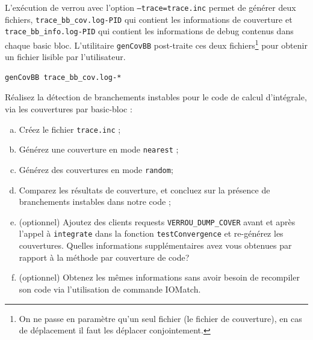 \documentclass[a4paper]{article}
\newcounter{Question}
\newenvironment{question}[1][\unskip]{
  \bigskip
  \stepcounter{Question}
  \def\questionTitle{ #1}
  \begin{mdframed}[style=question]
  }{
  \end{mdframed}
}
\begin{document}
L'exécution de verrou avec l'option \texttt{--trace=trace.inc} permet de générer deux fichiers, \texttt{trace\_bb\_cov.log-PID} qui contient les informations de couverture
et \texttt{trace\_bb\_info.log-PID} qui contient les informations de debug contenus dans chaque basic bloc.
L'utilitaire \texttt{genCovBB} post-traite ces deux fichiers\footnote{On ne passe en paramètre qu'un seul fichier (le fichier de couverture), en cas de déplacement il faut les déplacer conjointement.} pour obtenir un fichier lisible par l'utilisateur. 
\begin{verbatim}
genCovBB trace_bb_cov.log-*
\end{verbatim}


\begin{question}
  Réalisez la détection de branchements instables pour le code de calcul d'intégrale,
  via les couvertures par basic-bloc :
  \begin{enumerate}[(a)]
  \item Créez le fichier \texttt{trace.inc} ;

  \item Générez une couverture en mode \texttt{nearest} ;
  \item Générez des couvertures en mode \texttt{random};
    
  \item Comparez les résultats de couverture, et concluez sur la présence de
    branchements instables dans notre code ;

  \item (optionnel) Ajoutez des clients requests \texttt{VERROU\_DUMP\_COVER} avant et après l'appel à \texttt{integrate} dans la fonction \texttt{testConvergence} et re-générez les couvertures. 
    Quelles informations supplémentaires avez vous obtenues par rapport à la méthode par couverture de code?

  \item (optionnel) Obtenez les mêmes informations sans avoir besoin de recompiler son code via l'utilisation de commande IOMatch. 
  \end{enumerate}
\end{question}







\end{document}
